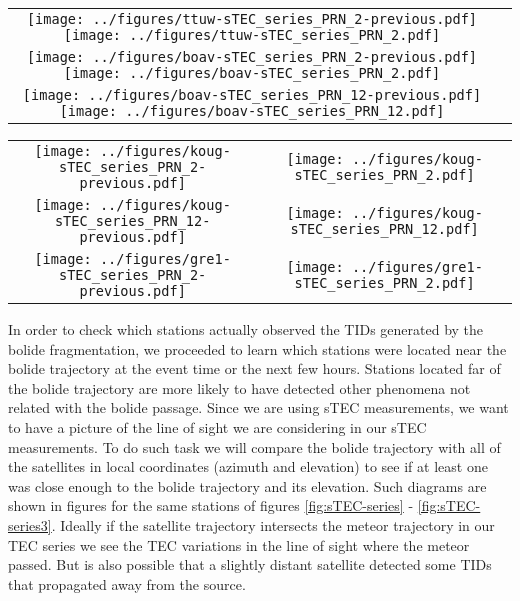 \begin{figure*}
    \centering
    \begin{tabular}{cc}
    \texttt{[image: ../figures/ttuw-sTEC\_series\_PRN\_2-previous.pdf]}  \texttt{[image: ../figures/ttuw-sTEC\_series\_PRN\_2.pdf]}\\
    \texttt{[image: ../figures/boav-sTEC\_series\_PRN\_2-previous.pdf]}  \texttt{[image: ../figures/boav-sTEC\_series\_PRN\_2.pdf]}\\
    \texttt{[image: ../figures/boav-sTEC\_series\_PRN\_12-previous.pdf]}  \texttt{[image: ../figures/boav-sTEC\_series\_PRN\_12.pdf]}\\
    \end{tabular}
    \caption{Continuation of figure \ref{fig:sTEC-series}}
    \label{fig:sTEC-series2}
\end{figure*}

\begin{figure*}
    \centering
    \begin{tabular}{cc}
    \texttt{[image: ../figures/koug-sTEC\_series\_PRN\_2-previous.pdf]} & \texttt{[image: ../figures/koug-sTEC\_series\_PRN\_2.pdf]}\\
    \texttt{[image: ../figures/koug-sTEC\_series\_PRN\_12-previous.pdf]} & \texttt{[image: ../figures/koug-sTEC\_series\_PRN\_12.pdf]}\\
    \texttt{[image: ../figures/gre1-sTEC\_series\_PRN\_2-previous.pdf]} & \texttt{[image: ../figures/gre1-sTEC\_series\_PRN\_2.pdf]}
    \end{tabular}
    \caption{Continuation of figures \ref{fig:sTEC-series} and \ref{fig:sTEC-series2}.}
    \label{fig:sTEC-series3}
\end{figure*}

In order to check which stations actually observed the TIDs generated by the bolide fragmentation, we proceeded to learn which stations were located near the bolide trajectory at the event time or the next few hours. Stations located far of the bolide trajectory are more likely to have detected other phenomena not related with the bolide passage. Since we are using sTEC measurements, we want to have a picture of the line of sight we are considering in our sTEC measurements. To do such task we will compare the bolide trajectory with all of the satellites in local coordinates (azimuth and elevation) to see if at least one was close enough to the bolide trajectory and its elevation. Such diagrams are shown in figures  for the same stations of figures \ref{fig:sTEC-series} - \ref{fig:sTEC-series3}. Ideally if the satellite trajectory intersects the meteor trajectory in our TEC series we see the TEC variations in the line of sight where the meteor passed. But is also possible that a slightly distant satellite detected some TIDs that propagated away from the source.

